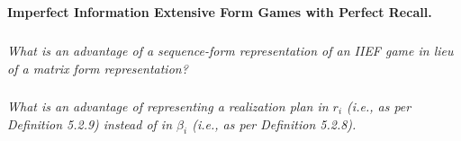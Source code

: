 \documentclass[12pt]{amsart}
\begin{document}
\subsection{}
\textbf{Imperfect Information Extensive Form Games with Perfect Recall.}

\subsubsection{}
\textit{What is an advantage of a sequence-form representation of an IIEF game in lieu of a
	matrix form representation?}

\subsubsection{}
\textit{What is an advantage of representing a realization plan in $r_i$ (i.e., as per Definition 5.2.9)
	instead of in $\beta_i$ (i.e., as per Definition 5.2.8).}
\end{document}
